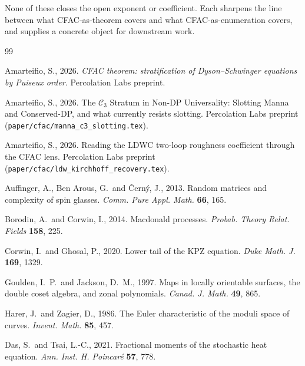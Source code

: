 \documentclass[10pt,a4paper,twocolumn]{article}
\theoremstyle{plain}
\theoremstyle{definition}
\newcommand{\Cstr}[1]{\mathcal{C}_{#1}}
\begin{document}
None of these closes the open exponent or coefficient.  Each
sharpens the line between what CFAC-as-theorem covers and what
CFAC-as-enumeration covers, and supplies a concrete object for
downstream work.

\begin{thebibliography}{99}
\small

  Amarteifio, S., 2026.
  \textit{CFAC theorem: stratification of Dyson--Schwinger equations
  by Puiseux order.}  Percolation Labs preprint.

  Amarteifio, S., 2026.
  The $\Cstr{3}$ Stratum in Non-DP Universality: Slotting Manna and
  Conserved-DP, and what currently resists slotting.
  Percolation Labs preprint
  (\texttt{paper/cfac/manna\_c3\_slotting.tex}).

  Amarteifio, S., 2026.
  Reading the LDWC two-loop roughness coefficient through the
  CFAC lens.
  Percolation Labs preprint
  (\texttt{paper/cfac/ldw\_kirchhoff\_recovery.tex}).

  Auffinger, A., Ben Arous, G.\ and \v{C}ern\'y, J., 2013.
  Random matrices and complexity of spin glasses.
  \textit{Comm. Pure Appl. Math.} \textbf{66}, 165.

  Borodin, A.\ and Corwin, I., 2014.
  Macdonald processes.
  \textit{Probab. Theory Relat. Fields} \textbf{158}, 225.

  Corwin, I.\ and Ghosal, P., 2020.
  Lower tail of the KPZ equation.
  \textit{Duke Math. J.} \textbf{169}, 1329.

  Goulden, I.~P.\ and Jackson, D.~M., 1997.
  Maps in locally orientable surfaces, the double coset algebra,
  and zonal polynomials.
  \textit{Canad. J. Math.} \textbf{49}, 865.

  Harer, J.\ and Zagier, D., 1986.
  The Euler characteristic of the moduli space of curves.
  \textit{Invent. Math.} \textbf{85}, 457.

  Das, S.\ and Tsai, L.-C., 2021.
  Fractional moments of the stochastic heat equation.
  \textit{Ann. Inst. H. Poincar\'e} \textbf{57}, 778.


\end{thebibliography}
\end{document}
